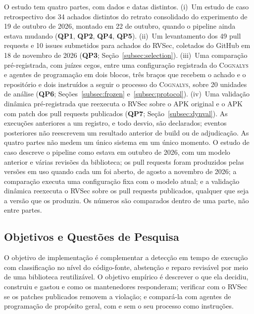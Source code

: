 \documentclass[conference]{IEEEtran}
\newcommand{\system}{\textsc{Cognalys}}
\newcommand{\researchq}[1]{\textbf{QP#1}}
\begin{document}
O estudo tem quatro partes, com dados e datas distintos. (i)~Um estudo de caso
retrospectivo dos 34 achados distintos do retrato consolidado do
experimento de 19 de outubro de 2026, montado em 22 de outubro, quando o pipeline
ainda estava mudando (\researchq{1}, \researchq{2}, \researchq{4}, \researchq{5}).
(ii)~Um levantamento dos 49 pull requests e 10 issues submetidos para achados do
RVSec, coletados do GitHub em 18 de novembro de 2026 (\researchq{3};
Seção~\ref{subsec:selection}). (iii)~Uma comparação pré-registrada, com juízes
cegos, entre uma configuração registrada do {\system} e agentes de programação em dois
blocos, três braços que recebem o achado e o repositório e dois instruídos
a seguir o processo do {\system}, sobre 20 unidades de análise
(\researchq{6}; Seções~\ref{subsec:frozen} e~\ref{subsec:protocol}).
(iv)~Uma validação dinâmica pré-registrada que reexecuta o RVSec sobre o APK original e
o APK com patch dos pull requests publicados (\researchq{7};
Seção~\ref{subsec:dynval}). As execuções anteriores a um registro, e todo
desvio, são declarados; eventos posteriores não reescrevem um resultado anterior de build ou de
adjudicação. As quatro partes não medem um único sistema em um único momento.
O estudo de caso descreve o pipeline como estava em outubro de 2026, com um
modelo anterior e várias revisões da biblioteca; os pull requests foram
produzidos pelas versões em uso quando cada um foi aberto, de agosto a novembro
de 2026; a comparação executa uma configuração fixa com o modelo atual; e a
validação dinâmica reexecuta o RVSec sobre os pull requests publicados,
qualquer que seja a versão que os produziu. Os números são comparados dentro de
uma parte, não entre partes.

\subsection{Objetivos e Questões de Pesquisa}
\label{subsec:rqs}

O objetivo de implementação é complementar a detecção em tempo de execução com
classificação no nível do código-fonte, abstenção e reparo revisável por meio de uma
biblioteca reutilizável. O objetivo empírico é descrever o que ela decidiu,
construiu e gastou e como os mantenedores responderam; verificar com o RVSec se os
patches publicados removem a violação; e compará-la com
agentes de programação de propósito geral, com e sem o seu processo como instruções.
\end{document}
